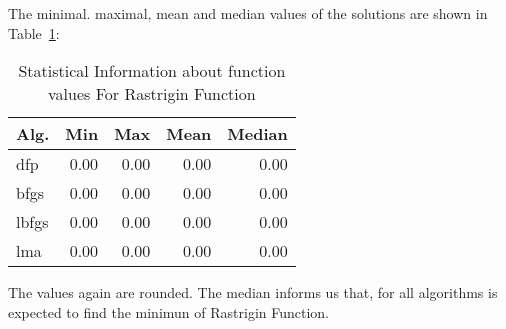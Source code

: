 
The minimal. maximal, mean and median values of the solutions are shown in Table~\ref{function_values:rastrigin4d}:

\begin{table}[H]
\centering
\caption{Statistical Information about function values For Rastrigin Function}
\label{function_values:rastrigin4d}
\begin{tabular}{lrrrr}
\toprule
 Alg. &  Min &  Max &  Mean &  Median \\
\midrule
  dfp & 0.00 & 0.00 &  0.00 &    0.00 \\
 bfgs & 0.00 & 0.00 &  0.00 &    0.00 \\
lbfgs & 0.00 & 0.00 &  0.00 &    0.00 \\
  lma & 0.00 & 0.00 &  0.00 &    0.00 \\
\bottomrule
\end{tabular}
\end{table}

The values again are rounded. The median informs us that, for all
algorithms is expected to find the minimun of Rastrigin Function.